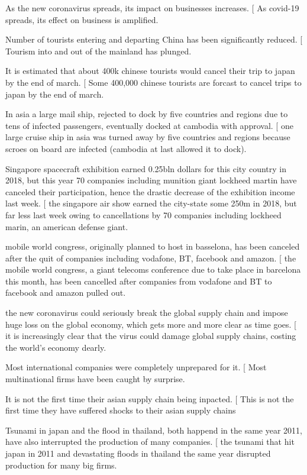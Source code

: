 \documentclass[a4paper,10pt]{article}
\begin{document}
{{{{{{{%

As the new coronavirus spreads, its impact on businesses increases.
[
	As covid-19 spreads, its effect on business is amplified.

Number of tourists entering and departing China has been significantly reduced.
[
	Tourism into and out of the mainland has plunged.

It is estimated that about 400k chinese tourists would cancel their trip to japan by the end of march.
[
	Some 400,000 chinese tourists are forcast to cancel trips to japan by the end of march.

In asia a large mail ship, rejected to dock by five countries and regions due to tens of infected passengers,
eventually docked at cambodia with approval.
[
	one large cruise ship in asia was turned away by five countries and regions because scroes on board are infected (cambodia at last allowed it to dock).

Singapore spacecraft exhibition earned 0.25bln dollars for this city country in 2018, but this year 70 companies including munition giant lockheed martin have canceled
their participation, hence the drastic decrease of the exhibition income last week.
[
	the singapore air show earned the city-state some 250m in 2018, but far less last week owing to cancellations by 70 companies including lockheed marin, an american defense giant.

mobile world congress, originally planned to host in basselona, has been canceled after the quit of companies including
vodafone, BT, facebook and amazon.
[
	the mobile world congress, a giant telecoms conference due to take place in barcelona this month, has been cancelled after
	companies from vodafone and BT to facebook and amazon pulled out.

the new coronavirus could seriously break the global supply chain and impose huge loss on the global economy, which
gets more and more clear as time goes.
[
	it is increasingly clear that the virus could damage global supply chains, costing the world's economy dearly.


Most international companies were completely unprepared for it.
[
	Most multinational firms have been caught by surprise.

It is not the first time their asian supply chain being inpacted.
[
	This is not the first time they have suffered shocks to their asian supply chains

Tsunami in japan and the flood in thailand, both happend in the same year 2011,
have also interrupted the production of many companies.
[
	the tsunami that hit japan in 2011 and devastating floods in thailand the same year
	disrupted production for many big firms.

}}}}}}}
\end{document}

